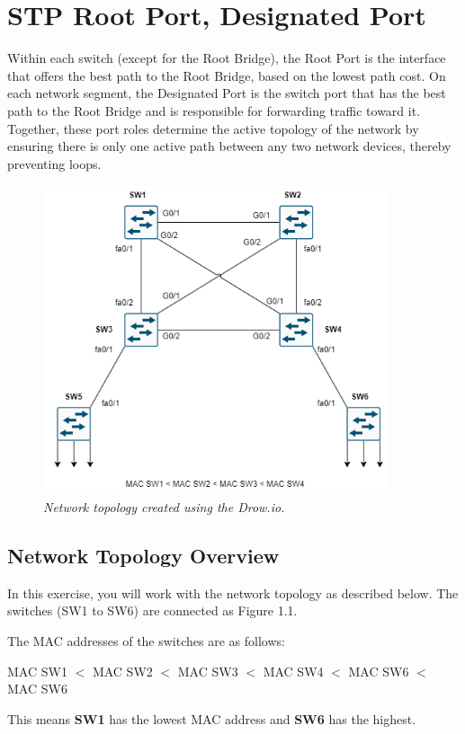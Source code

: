 \documentclass[a4paper]{book}
\begin{document}
\section*{STP Root Port, Designated Port}
Within each switch (except for the Root Bridge), the Root Port is the interface that offers the best path to the Root Bridge, based on the lowest path cost. On each network segment, the Designated Port is the switch port that has the best path to the Root Bridge and is responsible for forwarding traffic toward it. Together, these port roles determine the active topology of the network by ensuring there is only one active path between any two network devices, thereby preventing loops.


\begin{figure}[h]
    \centering
    \includegraphics[width=0.9\textwidth]{img/stp01.png}
    \caption{\textit{Network topology created using the Drow.io.}}
\end{figure}

\subsection*{Network Topology Overview}
In this exercise, you will work with the network topology as described below. The switches (SW1 to SW6) are connected as Figure 1.1.



The MAC addresses of the switches are as follows:
\begin{center}
    {MAC SW1 $<$ MAC SW2 $<$ MAC SW3 $<$ MAC SW4 $<$ MAC SW6 $<$ MAC SW6}
\end{center}
This means \textbf{SW1} has the lowest MAC address and \textbf{SW6} has the highest.
\end{document}
